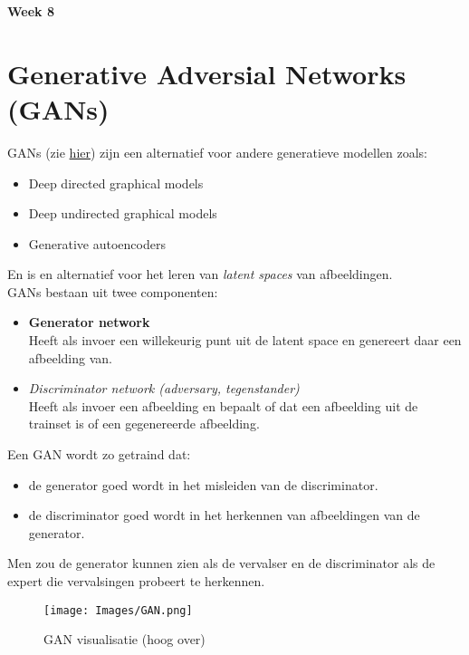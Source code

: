 {\large
\textbf{{\LARGE Week 8}}
\section{Generative Adversial Networks (GANs)}
GANs (zie \href{https://arxiv.org/abs/1406.2661}{hier}) zijn een alternatief voor andere generatieve modellen zoals:
\begin{itemize}
    \item Deep directed graphical models
    \item Deep undirected graphical models
    \item Generative autoencoders
\end{itemize}
\noindent En is en alternatief voor het leren van \textit{latent spaces} van afbeeldingen.\\

\noindent GANs bestaan uit twee componenten:
\begin{itemize}
    \item \textbf{Generator network}\\
    Heeft als invoer een willekeurig punt uit de latent space en genereert daar een afbeelding van.
    \item \textit{Discriminator network (adversary, tegenstander)}\\
    Heeft als invoer een afbeelding en bepaalt of dat een afbeelding uit de trainset is of een gegenereerde afbeelding.
\end{itemize}
\noindent Een GAN wordt zo getraind dat:
\begin{itemize}
    \item de generator goed wordt in het misleiden van de discriminator.
    \item de discriminator goed wordt in het herkennen van afbeeldingen van de generator.
\end{itemize}
\noindent Men zou de generator kunnen zien als de vervalser en de discriminator als de expert die vervalsingen probeert te herkennen.\\
\begin{figure}[h]
    \centering
    \texttt{[image: Images/GAN.png]}
    \caption{GAN visualisatie (hoog over)}
    \label{fig:gan}
\end{figure}

}
